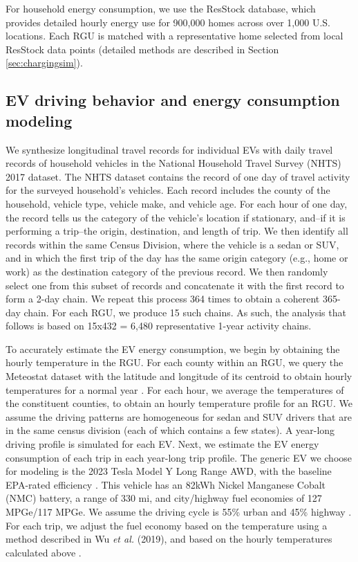 \documentclass[11pt,preprint]{elsarticle}
\begin{document}
For household energy consumption, we use the ResStock database, which provides detailed hourly energy use for 900,000 homes across over 1,000 U.S. locations. Each RGU is matched with a representative home selected from local ResStock data points (detailed methods are described in Section \ref{sec:chargingsim}). 

\subsection{EV driving behavior and energy consumption modeling}\label{sec:behavior and energy}
We synthesize longitudinal travel records for individual EVs with daily travel records of household vehicles in the National Household Travel Survey (NHTS) 2017 dataset. The NHTS dataset contains the record of one day of travel activity for the surveyed household's vehicles. Each record includes the county of the household, vehicle type, vehicle make, and vehicle age. For each hour of one day, the record tells us the category of the vehicle's location if stationary, and--if it is performing a trip--the origin, destination, and length of trip. We then identify all records within the same Census Division, where the vehicle is a sedan or SUV, and in which the first trip of the day has the same origin category (e.g., home or work) as the destination category of the previous record. We then randomly select one from this subset of records and concatenate it with the first record to form a 2-day chain. We repeat this process 364 times to obtain a coherent 365-day chain. For each RGU, we produce 15 such chains. As such, the analysis that follows is based on 15x432 = 6,480 representative 1-year activity chains. 

To accurately estimate the EV energy consumption, we begin by obtaining the hourly temperature in the RGU. For each county within an RGU, we query the Meteostat dataset with the latitude and longitude of its centroid to obtain hourly temperatures for a normal year \cite{noauthor_weather_2024}. For each hour, we average the temperatures of the constituent counties, to obtain an hourly temperature profile for an RGU. We assume the driving patterns are homogeneous for sedan and SUV drivers that are in the same census division (each of which contains a few states). A year-long driving profile is simulated for each EV. Next, we estimate the EV energy consumption of each trip in each year-long trip profile. The generic EV we choose for modeling is the 2023 Tesla Model Y Long Range AWD, with the baseline EPA-rated efficiency \cite{noauthor_2023_2024-1}. This vehicle has an 82kWh Nickel Manganese Cobalt (NMC) battery, a range of 330 mi, and city/highway fuel economies of 127 MPGe/117 MPGe.  We assume the driving cycle is 55\% urban and 45\% highway \cite{wu_regional_2019}. For each trip, we adjust the fuel economy based on the temperature using a method described in Wu \textit{et al.} (2019), and based on the hourly temperatures calculated above \cite{wu_regional_2019}.
\end{document}
